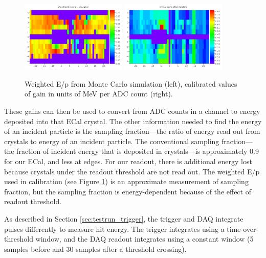 \begin{figure}[ht]
	\includegraphics[width=0.45\textwidth]{test2012/ecalperformance/ecalgainplots_corr_sim}
	\includegraphics[width=0.45\textwidth]{test2012/ecalperformance/gains}
	\caption{\small{Weighted E/p from Monte Carlo simulation (left), calibrated values of gain in units of MeV per ADC count (right).}}
	\label{fig:gains}
\end{figure}

These gains can then be used to convert from ADC counts in a channel to energy deposited into that ECal crystal.
The other information needed to find the energy of an incident particle is the sampling fraction---the ratio of energy read out from crystals to energy of an incident particle.
The conventional sampling fraction---the fraction of incident energy that is deposited in crystals---is approximately 0.9 for our ECal, and less at edges.
For our readout, there is additional energy lost because crystals under the readout threshold are not read out.
The weighted E/p used in calibration (see Figure \ref{fig:gains}) is an approximate measurement of sampling fraction, but the sampling fraction is energy-dependent because of the effect of readout threshold.

\vspace{1cm}{\bf Trigger performance [Sho/Ben]}


As described in Section \ref{sec:testrun_trigger}, the trigger and DAQ integrate pulses differently to measure hit energy. The trigger integrates using a time-over-threshold window, and the DAQ readout integrates using a constant window (5 samples before and 30 samples after a threshold crossing). 

